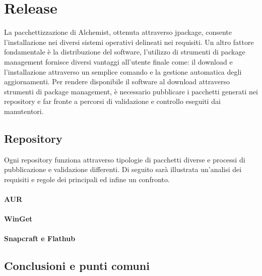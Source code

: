 \section{Release}

La pacchettizzazione di Alchemist, ottenuta attraverso jpackage, consente l'in\-stal\-la\-zio\-ne nei diversi sistemi operativi delineati nei requisiti. Un altro fattore fondamentale è la distribuzione del software, l'utilizzo di strumenti di package management fornisce diversi vantaggi all'utente finale come: il download e l'installazione attraverso un semplice comando e la gestione automatica degli aggiornamenti. Per rendere disponibile il software al download attraverso strumenti di package management, è necessario pubblicare i pacchetti generati nei repository e far fronte a percorsi di validazione e controllo eseguiti dai manutentori.

\subsection{Repository}

Ogni repository funziona attraverso tipologie di pacchetti diverse e processi di pubblicazione e validazione differenti. Di seguito sarà illustrata un'analisi dei requisiti e regole dei principali ed infine un confronto.

\paragraph{AUR}

\paragraph{WinGet}

\paragraph{Snapcraft e Flathub}

\subsection{Conclusioni e punti comuni}

